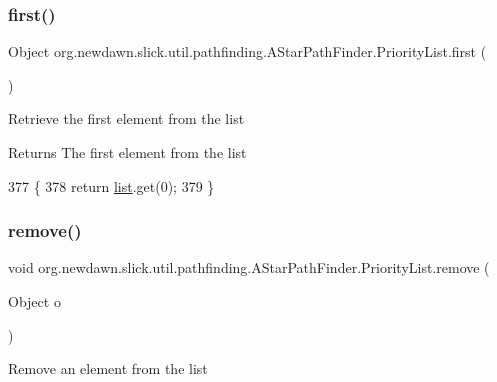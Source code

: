 \subsubsection{\texorpdfstring{first()}{first()}}
{\footnotesize\ttfamily Object org.\+newdawn.\+slick.\+util.\+pathfinding.\+A\+Star\+Path\+Finder.\+Priority\+List.\+first (\begin{DoxyParamCaption}{ }\end{DoxyParamCaption})\hspace{0.3cm}{\ttfamily [inline]}}

Retrieve the first element from the list

\begin{DoxyReturn}{Returns}
The first element from the list 
\end{DoxyReturn}

\begin{DoxyCode}
377                               \{
378             \textcolor{keywordflow}{return} \mbox{\hyperlink{classorg_1_1newdawn_1_1slick_1_1util_1_1pathfinding_1_1_a_star_path_finder_1_1_priority_list_a652f43252d1044a5a57102a8f30d2d47}{list}}.get(0);
379         \}
\end{DoxyCode}
\mbox{\label{classorg_1_1newdawn_1_1slick_1_1util_1_1pathfinding_1_1_a_star_path_finder_1_1_priority_list_a2876a214b6768f3aecdabdeed67a1986}} 
\subsubsection{\texorpdfstring{remove()}{remove()}}
{\footnotesize\ttfamily void org.\+newdawn.\+slick.\+util.\+pathfinding.\+A\+Star\+Path\+Finder.\+Priority\+List.\+remove (\begin{DoxyParamCaption}\item[{Object}]{o }\end{DoxyParamCaption})\hspace{0.3cm}{\ttfamily [inline]}}

Remove an element from the list


